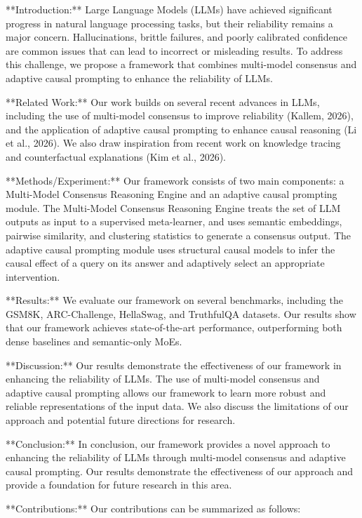 **Introduction:**
Large Language Models (LLMs) have achieved significant progress in natural language processing tasks, but their reliability remains a major concern. Hallucinations, brittle failures, and poorly calibrated confidence are common issues that can lead to incorrect or misleading results. To address this challenge, we propose a framework that combines multi-model consensus and adaptive causal prompting to enhance the reliability of LLMs.

**Related Work:**
Our work builds on several recent advances in LLMs, including the use of multi-model consensus to improve reliability (Kallem, 2026), and the application of adaptive causal prompting to enhance causal reasoning (Li et al., 2026). We also draw inspiration from recent work on knowledge tracing and counterfactual explanations (Kim et al., 2026).

**Methods/Experiment:**
Our framework consists of two main components: a Multi-Model Consensus Reasoning Engine and an adaptive causal prompting module. The Multi-Model Consensus Reasoning Engine treats the set of LLM outputs as input to a supervised meta-learner, and uses semantic embeddings, pairwise similarity, and clustering statistics to generate a consensus output. The adaptive causal prompting module uses structural causal models to infer the causal effect of a query on its answer and adaptively select an appropriate intervention.

**Results:**
We evaluate our framework on several benchmarks, including the GSM8K, ARC-Challenge, HellaSwag, and TruthfulQA datasets. Our results show that our framework achieves state-of-the-art performance, outperforming both dense baselines and semantic-only MoEs.

**Discussion:**
Our results demonstrate the effectiveness of our framework in enhancing the reliability of LLMs. The use of multi-model consensus and adaptive causal prompting allows our framework to learn more robust and reliable representations of the input data. We also discuss the limitations of our approach and potential future directions for research.

**Conclusion:**
In conclusion, our framework provides a novel approach to enhancing the reliability of LLMs through multi-model consensus and adaptive causal prompting. Our results demonstrate the effectiveness of our approach and provide a foundation for future research in this area.

**Contributions:**
Our contributions can be summarized as follows:

